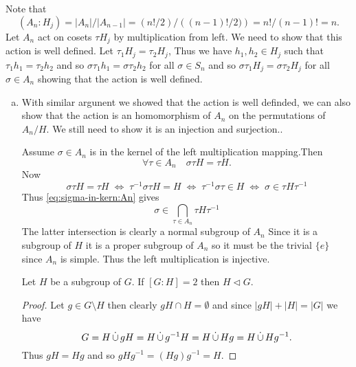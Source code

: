 \documentclass[12pt]{book}
\def\DOTSB{\relax}
\def\dotcup{\DOTSB\mathop{\overset{\textstyle.}\cup}}
\def\subnormal{\vartriangleleft}
\newcounter{myenumi}
\newenvironment{myenumerate}
{\begin{enumerate}
 \setcounter{enumi}{\themyenumi}
}
{\setcounter{myenumi}{\theenumi}
 \end{enumerate}}
\begin{document}
\begin{myenumerate}
Note that 
\begin{equation*}
(A_n: H_j) = |A_n|/|A_{n-1}| = (n!/2)/\left((n-1)!/2)\right) = n!/(n-1)! = n.
\end{equation*}
Let \(A_n\) act on cosets \(\tau H_j\) by multiplication from left.
We need to show that this action is well defined.
Let \(\tau_1 H_j = \tau_2 H_j\),
Thus we have \(h_1,h_2\in H_j\) such that  
\(\tau_1 h_1 = \tau_2 h_2\)
and so
\(\sigma\tau_1 h_1 = \sigma\tau_2 h_2\) for all \(\sigma \in S_n\)
and so 
\(\sigma\tau_1 H_j = \sigma\tau_2 H_j\) for all \(\sigma \in A_n\)
showing that the action is well defined.
\begin{enumerate}[(a)]
\item
With similar argunent we showed that the action is well definded,
we can also show that the action is an homomorphism of \(A_n\)
on the permutations of \(A_n/H\).
We still need to show it is an injection and surjection..

Assume \(\sigma \in A_n\) is in the kernel
of the left multiplication mapping.Then 
\begin{equation} \label{eq:sigma-in-kern:An}
\forall \tau\in A_n\quad \sigma\tau H = \tau H.
\end{equation}
Now
\begin{equation*}
\sigma\tau H = \tau H
\;\Leftrightarrow\;
\tau^{-1}\sigma\tau H = H
\;\Leftrightarrow\;
\tau^{-1}\sigma\tau \in H
\;\Leftrightarrow\;
\sigma \in \tau H \tau^{-1}
\end{equation*}
Thus \eqref{eq:sigma-in-kern:An} gives
\begin{equation*}
\sigma \in \bigcap_{\tau\in A_n} \tau H \tau^{-1}
\end{equation*}
The latter intersection is clearly a normal subgroup of \(A_n\)
Since it is a subgroup of $H$ it is a proper subgroup of \(A_n\)
so it must be the trivial \(\{e\}\) since \(A_n\) is simple.
Thus the left multiplication is injective.


\begin{llem} \label{llem:half:normal}
Let $H$ be a subgroup of $G$. If \([G:H]=2\) then \(H \subnormal G\).
\end{llem}
\begin{proof}
Let \(g \in G\setminus H\) then clearly  \(gH\cap H = \emptyset\)
and since \(|gH| + |H| = |G|\) we have
\begin{equation*}
G = H \dotcup gH = H \dotcup g^{-1}H = H \dotcup Hg = H \dotcup Hg^{-1}.
\end{equation*}
Thus \(gH = Hg\) and so \(gHg^{-1}= (Hg)g^{-1} = H\).
\end{proof}


\end{enumerate}
\end{myenumerate}
\end{document}
